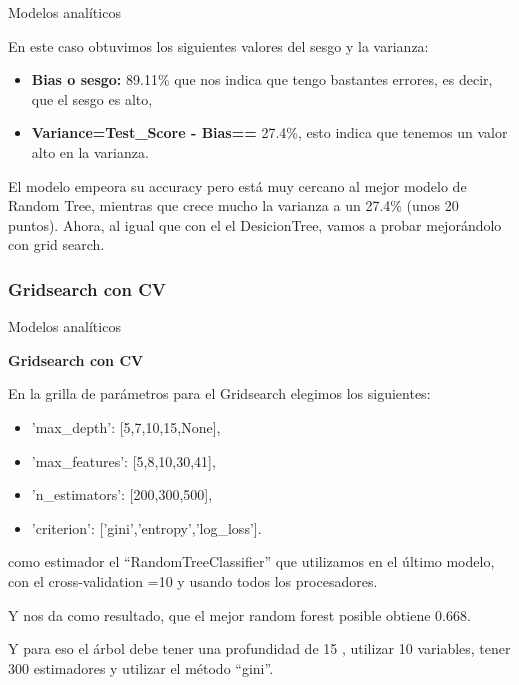 \documentclass[pdf]{beamer}
\begin{document}
\begin{frame}{Modelos analíticos}

    En este caso  obtuvimos los siguientes valores del sesgo y la varianza:
    \begin{itemize}
        \item \textbf{Bias o sesgo:} 89.11\% que nos indica que tengo bastantes errores, es decir, que el sesgo es alto,
        \item \textbf{Variance=Test\_Score - Bias==} 27.4\%, esto indica que tenemos un valor alto en la varianza.
        \end{itemize}

    El modelo empeora su accuracy pero está muy cercano al mejor modelo de Random Tree, mientras que crece mucho la varianza a un 27.4\% (unos 20 puntos). Ahora, al igual que con el el DesicionTree, vamos a probar mejorándolo con grid search.

\end{frame}

    \subsubsection{Gridsearch con CV}

\begin{frame}{Modelos analíticos}

    \begin{Large}
        \textbf{Gridsearch con CV}
    \end{Large}
    \newline

    En la grilla de parámetros para el Gridsearch elegimos los siguientes:
    \begin{itemize}
        \item 'max\_depth': [5,7,10,15,None],
        \item 'max\_features': [5,8,10,30,41],
        \item 'n\_estimators': [200,300,500],
        \item 'criterion': ['gini','entropy','log\_loss'].
    \end{itemize}
    como estimador el ``RandomTreeClassifier'' que utilizamos en el último modelo, con el cross-validation =10 y  usando todos los procesadores.

    Y nos da como resultado, que el mejor random forest posible obtiene 0.668. 

    Y para eso el árbol debe tener una profundidad de 15 , utilizar  10  variables, tener  300  estimadores y utilizar el método ``gini''.

\end{frame}
\end{document}

